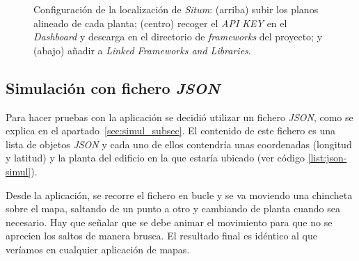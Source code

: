 \begin{enumerate}
\begin{figure}[tbp]
\centering
{}
\vspace{3ex}
\vspace{3ex}
\caption[Configuración de la localización de \textit{Situm}.]{Configuración de la localización de \textit{Situm}: (arriba) subir los planos alineado de cada planta; (centro) recoger el \textit{API KEY} en el \textit{Dashboard} y descarga en el directorio de \textit{frameworks} del proyecto; y (abajo) añadir a \textit{Linked Frameworks and Libraries}.}
\end{figure}
\end{enumerate}

\subsection{Simulación con fichero \textit{JSON}}
Para hacer pruebas con la aplicación se decidió utilizar un fichero \textit{JSON}, como se explica en el apartado~\ref{sec:simul_subsec}. El contenido de este fichero es una lista de objetos \textit{JSON} y cada uno de ellos contendría unas coordenadas (longitud y latitud) y la planta del edificio en la que estaría ubicado (ver código \ref{list:json-simul}).

Desde la aplicación, se recorre el fichero en bucle y se va moviendo una chincheta sobre el mapa, saltando de un punto a otro y cambiando de planta cuando sea necesario.
Hay que señalar que se debe animar el movimiento para que no se aprecien los saltos de manera brusca.
El resultado final es idéntico al que veríamos en cualquier aplicación de mapas.

